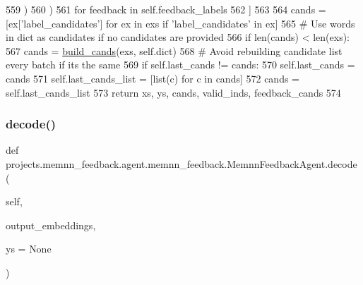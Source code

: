 \begin{DoxyCode}
559                         )
560                     )
561                     \textcolor{keywordflow}{for} feedback \textcolor{keywordflow}{in} self.feedback\_labels
562                 ]
563 
564         cands = [ex[\textcolor{stringliteral}{'label\_candidates'}] \textcolor{keywordflow}{for} ex \textcolor{keywordflow}{in} exs \textcolor{keywordflow}{if} \textcolor{stringliteral}{'label\_candidates'} \textcolor{keywordflow}{in} ex]
565         \textcolor{comment}{# Use words in dict as candidates if no candidates are provided}
566         \textcolor{keywordflow}{if} len(cands) < len(exs):
567             cands = \hyperlink{namespaceprojects_1_1memnn__feedback_1_1agent_1_1memnn__feedback_a098f9dace138acef711a30ce16831284}{build\_cands}(exs, self.dict)
568         \textcolor{comment}{# Avoid rebuilding candidate list every batch if its the same}
569         \textcolor{keywordflow}{if} self.last\_cands != cands:
570             self.last\_cands = cands
571             self.last\_cands\_list = [list(c) \textcolor{keywordflow}{for} c \textcolor{keywordflow}{in} cands]
572         cands = self.last\_cands\_list
573         \textcolor{keywordflow}{return} xs, ys, cands, valid\_inds, feedback\_cands
574 
\end{DoxyCode}
\mbox{\label{classprojects_1_1memnn__feedback_1_1agent_1_1memnn__feedback_1_1MemnnFeedbackAgent_a8e62a0326b38fe1ec6b7ef785638fd98}} 
\subsubsection{\texorpdfstring{decode()}{decode()}}
{\footnotesize\ttfamily def projects.\+memnn\+\_\+feedback.\+agent.\+memnn\+\_\+feedback.\+Memnn\+Feedback\+Agent.\+decode (\begin{DoxyParamCaption}\item[{}]{self,  }\item[{}]{output\+\_\+embeddings,  }\item[{}]{ys = {\ttfamily None} }\end{DoxyParamCaption})}



